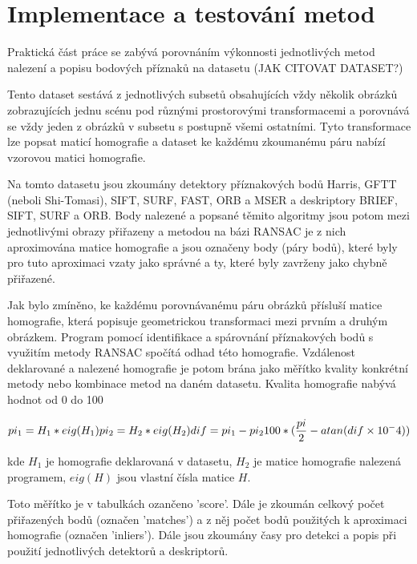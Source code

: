 
\chapter{Implementace a testování metod}

Praktická část práce se zabývá porovnáním výkonnosti jednotlivých
metod nalezení a popisu bodových příznaků na datasetu (JAK CITOVAT DATASET?)

Tento dataset sestává z jednotlivých subsetů obsahujících vždy několik obrázků
zobrazujících jednu scénu pod různými prostorovými transformacemi a porovnává se
vždy jeden z obrázků v subsetu s postupně všemi ostatními. Tyto transformace
lze popsat maticí homografie a dataset ke každému zkoumanému páru nabízí vzorovou
matici homografie.

Na tomto datasetu jsou zkoumány detektory příznakových bodů Harris, GFTT (neboli
Shi-Tomasi), SIFT, SURF, FAST, ORB a MSER a deskriptory BRIEF, SIFT, SURF a ORB.
Body nalezené a popsané těmito algoritmy jsou potom mezi jednotlivými obrazy
přiřazeny a metodou na bázi RANSAC je z nich aproximována matice homografie a 
jsou označeny body (páry bodů), které byly pro tuto aproximaci vzaty jako správné a ty, 
které byly zavrženy jako chybně přiřazené. 


Jak bylo zmíněno, ke každému porovnávanému páru obrázků přísluší matice homografie,
která popisuje geometrickou transformaci mezi prvním a druhým obrázkem. Program
pomocí identifikace a spárovnání příznakových bodů s využitím metody RANSAC spočítá
odhad této homografie. Vzdálenost deklarované a nalezené homografie je potom brána
jako měřítko kvality konkrétní metody nebo kombinace metod na daném datasetu. Kvalita
homografie nabývá hodnot od 0 do 100%

\begin{equation}
	pi_1 = H_1 * eig(H_1) \\
	pi_2 = H_2 * eig(H_2) \\
	dif = pi_1 - pi_2 \\
	100*(\frac{pi}{2} - atan(dif \times{} 10^-4))
\end{equation}

kde $H_1$ je homografie deklarovaná v datasetu, $H_2$ je matice homografie nalezená
programem, $eig(H)$ jsou vlastní čísla matice $H$. 

Toto měřítko je v tabulkách ozančeno 'score'. Dále je zkoumán celkový počet přiřazených
bodů (označen 'matches') a z něj počet bodů použitých k aproximaci homografie (označen 'inliers').
Dále jsou zkoumány časy pro detekci a popis při použití jednotlivých detektorů a deskriptorů. 

